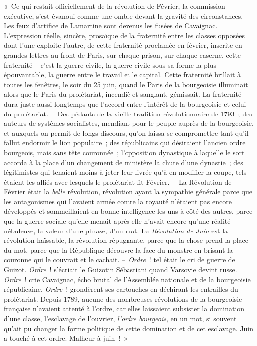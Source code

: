 \documentclass[french,twoside]{book} %
\begin{document}
« Ce qui restait officiellement de la révolution de Février, la commission exécutive, s’est évanoui comme une ombre devant la gravité des circonstances. Les feux d’artifice de Lamartine sont devenus les fusées de Cavaignac. L’expression réelle, sincère, prosaïque de la fraternité entre les classes opposées dont l’une exploite l’autre, de cette fraternité proclamée en février, inscrite en grandes lettres au front de Paris, sur chaque prison, sur chaque caserne, cette fraternité – c’est la guerre civile, la guerre civile sous sa forme la plus épouvantable, la guerre entre le travail et le capital. Cette fraternité brillait à toutes les fenêtres, le soir du 25 juin, quand le Paris de la bourgeoisie illuminait alors que le Paris du prolétariat, incendié et sanglant, gémissait. La fraternité dura juste aussi longtemps que l’accord entre l’intérêt de la bourgeoisie et celui du prolétariat. – Des pédants de la vieille tradition révolutionnaire de 1793 ; des auteurs de systèmes socialistes, mendiant pour le peuple auprès de la bourgeoisie, et auxquels on permit de longs discours, qu’on laissa se compromettre tant qu’il fallut endormir le lion populaire ; des républicains qui désiraient l’ancien ordre bourgeois, mais sans tête couronnée ; l’opposition dynastique à laquelle le sort accorda à la place d’un changement de ministère la chute d’une dynastie ; des légitimistes qui tenaient moins à jeter leur livrée qu’à en modifier la coupe, tels étaient les alliés avec lesquels le prolétariat fit Février. – La Révolution de Février était la \emph{belle} révolution, révolution ayant la sympathie générale parce que les antagonismes qui l’avaient armée contre la royauté n’étaient pas encore développés et sommeillaient en bonne intelligence les uns à côté des autres, parce que la guerre sociale qu’elle menait après elle n’avait encore qu’une réalité nébuleuse, la valeur d’une phrase, d’un mot. La \emph{Révolution de Juin} est la révolution haïssable, la révolution répugnante, parce que la chose prend la place du mot, parce que la République découvre la face du monstre en brisant la couronne qui le couvrait et le cachait. – \emph{Ordre} ! tel était le cri de guerre de Guizot. \emph{Ordre} ! s’écriait le Guizotin Sébastiani quand Varsovie devint russe. \emph{Ordre} ! crie Cavaignac, écho brutal de l’Assemblée nationale et de la bourgeoisie républicaine. \emph{Ordre} ! grondèrent ses cartouches en déchirant les entrailles du prolétariat. Depuis 1789, aucune des nombreuses révolutions de la bourgeoisie française n’avaient attenté à l’ordre, car elles laissaient subsister la domination d’une classe, l’esclavage de l’ouvrier, \emph{l’ordre bourgeois}, en un mot, si souvent qu’ait pu changer la forme politique de cette domination et de cet esclavage. Juin a touché à cet ordre. Malheur à juin ! »\par
\end{document}
